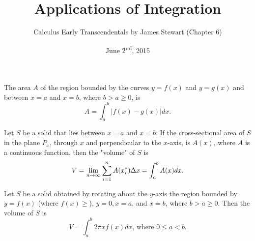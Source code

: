 \documentclass[a4paper,8pt]{article}
\title{Applications of Integration}
\author{Calculus Early Transcendentals by James Stewart (Chapter 6)}
\date{June 2\textsuperscript{nd}, 2015}
\begin{document}
\maketitle
{}

\begin{outline}

    The area \(A\) of the region bounded by the curves \(y = f(x)\) and \(y = g(x)\) and between \(x=a\) and \(x=b\),
    where \(b > a \geq 0\), is \[ A = \int_a^b |f(x)-g(x)|dx\text{.} \]

    Let \(S\) be a solid that lies between \(x = a\) and \(x = b\). If the cross-sectional area of \(S\) in the
    plane \(P_x\), through \(x\) and perpendicular to the \(x\)-axis, is \(A(x)\), where \(A\) is a continuous function,
    then the "volume" of \(S\) is \[V = \lim\limits_{n\rightarrow \infty^{}} \sum_{i=1}^n A(x_i^*)\Delta x = \int_a^bA(x)dx\text{.}\]

    Let \(S\) be a solid obtained by rotating about the \(y\)-axis the region bounded by \(y = f(x)\) (where \(f(x)
    \geq \)), \(y = 0, x = a\), and \(x = b\), where \(b > a \geq 0\). Then the volume of \(S\) is
    \[ V= \int_a^b 2\pi x f(x)dx\text{, where } 0 \leq a < b\text{.} \]


\end{outline}
\end{document}
